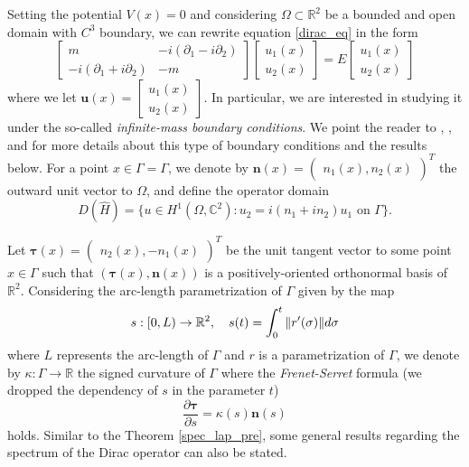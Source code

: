 Setting the potential \(V(x)=0\) and considering \(\Omega \subset \mathbb{R}^2\) be a bounded and open domain with \(C^3\) boundary, we can rewrite equation \eqref{dirac_eq} in the form    
\begin{equation}\label{dirac}
    \begin{bmatrix}
        m & -i(\partial_1 - i \partial_2)\\
        -i(\partial_1 + i \partial_2) & -m
    \end{bmatrix}
    \begin{bmatrix}
        u_1(x)\\
        u_2(x)
    \end{bmatrix}
    =E
    \begin{bmatrix}
    u_1(x)\\
    u_2(x)
    \end{bmatrix}
\end{equation}
where we let \(\mathbf{u}(x)=\begin{bmatrix}
    u_1(x)\\
    u_2(x)
    \end{bmatrix}\).
In particular, we are interested in studying it under the so-called \textit{infinite-mass boundary conditions}. We point the reader to \cite{lotoreichik2019sharp}, \cite{briet2022spectral}, and \cite{antunes2021variational} for more details about this type of boundary conditions and the results below. For a point \(x \in \Gamma = \Gamma\), we denote by \(\mathbf{n}(x) = \begin{pmatrix}
    n_1(x), n_2(x)
\end{pmatrix}^T\) the outward unit vector to \(\Omega\), and define the operator domain
\[
D(\hat{H}) = \{u \in H^1(\Omega, \mathbb{C}^2): u_2 = i(n_1+i n_2)u_1 \text{ on } \Gamma\}.
\]

Let \(\mathbf{\tau}(x) = \begin{pmatrix}
    n_2(x), -n_1(x)
\end{pmatrix}^T\) be the unit tangent vector to some point \(x \in \Gamma\) such that \((\mathbf{\tau}(x), \mathbf{n}(x))\) is a positively-oriented orthonormal basis of \(\mathbb{R}^2\). Considering the arc-length parametrization of \(\Gamma\) given by the map
\[
s: [0, L) \rightarrow \mathbb{R}^2, \quad s(t) = \int_0^t \norm{r'(\sigma)} d\sigma
\]
where \(L\) represents the arc-length of \(\Gamma\) and \(r\) is a parametrization of \(\Gamma\), we denote by \(\kappa:\Gamma \rightarrow \mathbb{R}\) the signed curvature of \(\Gamma\) where the \textit{Frenet-Serret} formula (we dropped the dependency of \(s\) in the parameter \(t\))
\[
    \frac{\partial\mathbf{\tau}}{\partial s}=\kappa(s)\mathbf{n}(s)
\]
holds. Similar to the Theorem \ref{spec_lap_pre}, some general results regarding the spectrum of the Dirac operator can also be stated.

